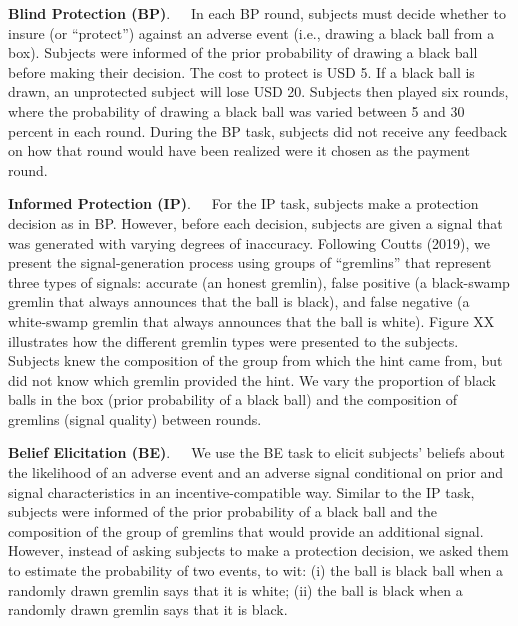 \documentclass[12pt,a4paper]{article}
\begin{document}
\bigskip
\noindent\textbf{Blind Protection (BP)}.\ \ \ In each BP round, subjects must decide whether to insure (or “protect”) against an adverse event (i.e., drawing a black ball from a box).  Subjects were informed of the prior probability of drawing a black ball before making their decision. The cost to protect is USD 5. If a black ball is drawn, an unprotected subject will lose USD 20. Subjects then played six rounds, where the probability of drawing a black ball was varied between 5 and 30 percent in each round. During the BP task, subjects did not receive any feedback on how that round would have been realized were it chosen as the payment round.

\bigskip
\noindent\textbf{Informed Protection (IP)}.\ \ \ For the IP task, subjects make a protection decision as in BP. However, before each decision, subjects are given a signal that was generated with varying degrees of inaccuracy. Following Coutts (2019), we present the signal-generation process using groups of ``gremlins'' that represent three types of signals: accurate (an honest gremlin), false positive (a black-swamp gremlin that always announces that the ball is black), and false negative (a white-swamp gremlin that always announces that the ball is white). Figure XX illustrates how the different gremlin types were presented to the subjects. Subjects knew the composition of the group from which the hint came from, but did not know which gremlin provided the hint. We vary the proportion of black balls in the box (prior probability of a black ball) and the composition of gremlins (signal quality) between rounds.  

\bigskip
\noindent\textbf{Belief Elicitation (BE)}.\ \ \ We use the BE task to elicit subjects' beliefs about the likelihood of an adverse event and an adverse signal conditional on prior and signal characteristics in an incentive-compatible way. Similar to the IP task, subjects were informed of the prior probability of a black ball and the composition of the group of gremlins that would provide an additional signal. However, instead of asking subjects to make a protection decision, we asked them to estimate the probability of two events, to wit: (i) the ball is black ball when a randomly drawn gremlin says that it is white; (ii) the ball is black when a randomly drawn gremlin says that it is black.   
\end{document}
